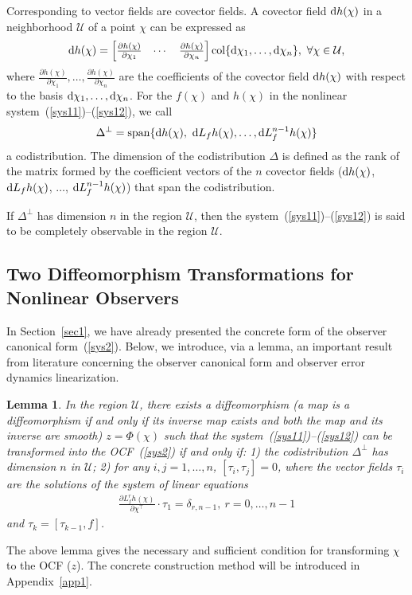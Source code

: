 \documentclass[11pt]{article}
\newtheorem{lemma}{Lemma}
\DeclareMathOperator{\spanop}{span}
\DeclareMathOperator{\col}{col}
\begin{document}
Corresponding to vector fields are covector fields. A covector field ${\rm d}h(\chi)$ in a neighborhood $\mathcal{U}$ of a point $\chi$ can be expressed as
\begin{align}
	{\rm d}h(\chi)=\begin{bmatrix}
		\frac{\partial h(\chi)}{\partial \chi_1}&\cdots&\frac{\partial h(\chi)}{\partial \chi_n}
	\end{bmatrix}\col\{{\rm d}\chi_1,\ldots,{\rm d}\chi_n\},~\forall \chi\in\mathcal{U},
\end{align}
where $\frac{\partial h(\chi)}{\partial \chi_1}, \ldots, \frac{\partial h(\chi)}{\partial \chi_n}$ are the coefficients of the covector field ${\rm d}h(\chi)$ with respect to the basis ${\rm d}\chi_1,\ldots,{\rm d}\chi_n$. For the $f(\chi)$ and $h(\chi)$ in the nonlinear system~(\ref{sys11})--(\ref{sys12}), we call
\begin{align}
	\Delta^\perp=\spanop\{{\rm d}h(\chi),~{\rm d}L_fh(\chi),\ldots,{\rm d}L_f^{n-1}h(\chi)\}
\end{align}
a codistribution. The dimension of the codistribution $\Delta$ is defined as the rank of the matrix formed by the coefficient vectors of the $n$ covector fields (${\rm d}h(\chi)$, ${\rm d}L_fh(\chi)$, $\ldots$, ${\rm d}L_f^{n-1}h(\chi)$) that span the codistribution.

If $\Delta^\perp$ has dimension $n$ in the region $\mathcal{U}$, then the system~(\ref{sys11})--(\ref{sys12}) is said to be completely observable in the region $\mathcal{U}$.

\subsection{Two Diffeomorphism Transformations for Nonlinear Observers}

In Section~\ref{sec1}, we have already presented the concrete form of the observer canonical form~(\ref{sys2}). Below, we introduce, via a lemma, an important result from literature \cite{Isidori1995} concerning the observer canonical form and observer error dynamics linearization.
\begin{lemma}\label{lem:ocf}
	In the region $\mathcal{U}$, there exists a diffeomorphism (a map is a diffeomorphism if and only if its inverse map exists and both the map and its inverse are smooth) $z=\Phi(\chi)$ such that the system~(\ref{sys11})--(\ref{sys12}) can be transformed into the OCF~(\ref{sys2}) if and only if: 1) the codistribution $\Delta^\perp$ has dimension $n$ in $\mathcal{U}$; 2) for any $i,j=1,\ldots,n$, $[\tau_i,\tau_j]=0$, where the vector fields $\tau_i$ are the solutions of the system of linear equations
	\begin{align}
		\frac{\partial L_f^rh(\chi)}{\partial \chi^\top}\cdot\tau_1=\delta_{r,n-1},~r=0,\ldots,n-1\label{ocf}
	\end{align}
	and $\tau_k=[\tau_{k-1},f]$.
\end{lemma}
The above lemma gives the necessary and sufficient condition for transforming $\chi$ to the OCF ($z$). The concrete construction method will be introduced in Appendix~\ref{app1}.
\end{document}
